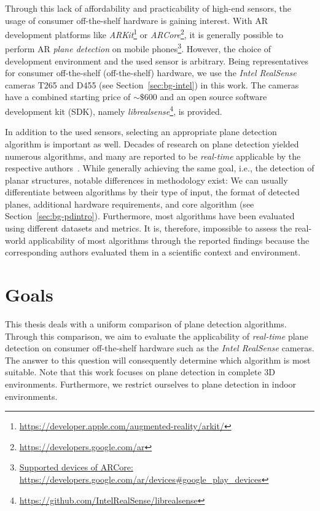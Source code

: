\documentclass[main.tex]{subfiles}
\begin{document}
Through this lack of affordability and practicability of high-end sensors, the usage of consumer off-the-shelf hardware is gaining interest.
With AR development platforms like \textit{ARKit}\footnote{\href{https://developer.apple.com/augmented-reality/arkit/}{https://developer.apple.com/augmented-reality/arkit/}} or \textit{ARCore}\footnote{\href{https://developers.google.com/ar}{https://developers.google.com/ar}}, it is generally possible to perform AR \textit{plane detection} on mobile phones\footnote{\href{https://developers.google.com/ar/devices\#google\_play\_devices}{Supported devices of ARCore: https://developers.google.com/ar/devices\#google\_play\_devices}}. However, the choice of development environment and the used sensor is arbitrary.
Being representatives for consumer off-the-shelf (off-the-shelf) hardware, we use the \textit{Intel RealSense} cameras T265 and D455 (see Section~\ref{sec:bg-intel}) in this work. The cameras have a combined starting price of ${\sim}\$600$ and an open source software development kit (SDK), namely \textit{librealsense}\footnote{\href{https://github.com/IntelRealSense/librealsense}{https://github.com/IntelRealSense/librealsense}}, is provided.

In addition to the used sensors, selecting an appropriate plane detection algorithm is important as well.
Decades of research on plane detection yielded numerous algorithms, and many are reported to be \textit{real-time} applicable by the respective authors~\cite{LimbergerOliveira2015HT3D, Roychoudhury_Missura_Bennewitz_2021_new, Xu_Xie_Chen_Wang_2020, yoohyun,Feng_Taguchi_Kamat_2014}.
While generally achieving the same goal, i.e., the detection of planar structures, notable differences in methodology exist: We can usually differentiate between algorithms by their type of input, the format of detected planes, additional hardware requirements, and core algorithm (see Section~\ref{sec:bg-pdintro}). Furthermore, most algorithms have been evaluated using different datasets and metrics.
It is, therefore, impossible to assess the real-world applicability of most algorithms through the reported findings because the corresponding authors evaluated them in a scientific context and environment.

\section{Goals}
\label{sec:goals}
This thesis deals with a uniform comparison of plane detection algorithms.
Through this comparison, we aim to evaluate the applicability of \textit{real-time} plane detection on consumer off-the-shelf hardware such as the \textit{Intel RealSense} cameras. The answer to this question will consequently determine which algorithm is most suitable.
Note that this work focuses on plane detection in complete 3D environments.
Furthermore, we restrict ourselves to plane detection in indoor environments.
\end{document}
